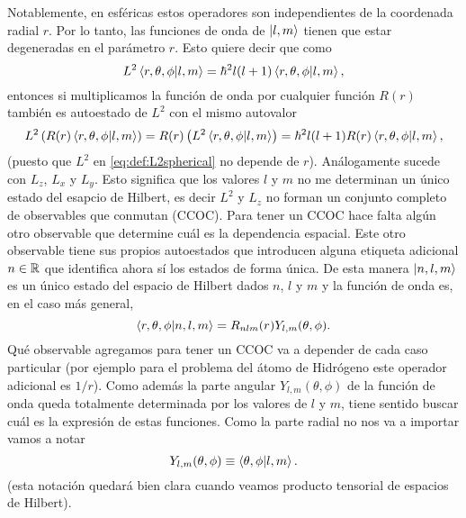 \documentclass[10pt, a4paper]{article}
\newcommand{\Ylm}{Y_{l,m}}
\numberwithin{equation}{subsection}
\begin{document}
Notablemente, en esféricas estos operadores son independientes de la
coordenada radial $r$.
Por lo tanto, las funciones de onda de $\ket{l,m}$ tienen que estar degeneradas
en el parámetro $r$.
Esto quiere decir que como
\begin{equation}
  L^2\braket{r,\theta,\phi}{l,m} = \hbar^2l(l+1)\braket{r,\theta,\phi}{l,m},
\end{equation}
entonces si multiplicamos la función de onda por cualquier función $R(r)$
también es autoestado de $L^2$ con el mismo autovalor
\begin{equation}
  L^2\left(R(r)\braket{r,\theta,\phi}{l,m}\right) =
    R(r)\left(L^2\braket{r,\theta,\phi}{l,m}\right) =
    \hbar^2l(l+1)R(r)\braket{r,\theta,\phi}{l,m},
\end{equation}
(puesto que $L^2$ en \eqref{eq:def:L2spherical} no depende de $r$).
Análogamente sucede con $L_z$, $L_x$ y $L_y$.
Esto significa que los valores $l$ y $m$ no me determinan un único estado del
esapcio de Hilbert, es decir $L^2$ y $L_z$ no forman un conjunto completo de
observables que conmutan (CCOC). Para tener un CCOC hace falta algún otro
observable que determine cuál es la dependencia espacial. Este otro observable
tiene sus propios autoestados que introducen alguna etiqueta adicional $n \in
\mathbb{R}$ que identifica ahora sí los estados de forma única. De esta manera
$\ket{n,l,m}$ es un único estado del espacio de Hilbert dados $n$, $l$ y $m$ y
la función de onda es, en el caso más general,
\begin{equation} \label{eq:def:radialplusharmspheric}
  \braket{r,\theta,\phi}{n,l,m} = R_{nlm}(r)\Ylm(\theta,\phi).
\end{equation}
Qué observable agregamos para tener un CCOC va a depender de cada caso
particular (por ejemplo para el problema del átomo de Hidrógeno este operador
adicional es $1/r$). Como además la parte angular $\Ylm(\theta,\phi)$ de la
función de onda queda totalmente determinada por los valores de $l$ y
$m$, tiene sentido buscar cuál es la expresión de estas funciones. Como la
parte radial no nos va a importar vamos a notar
\begin{equation} \label{eq:def:harmspheric}
  \Ylm(\theta,\phi) \defeq \braket{\theta,\phi}{l,m}.
\end{equation}
(esta notación quedará bien clara cuando veamos producto tensorial de espacios
de Hilbert).

\bigbreak
{}
\bigbreak
\end{document}
